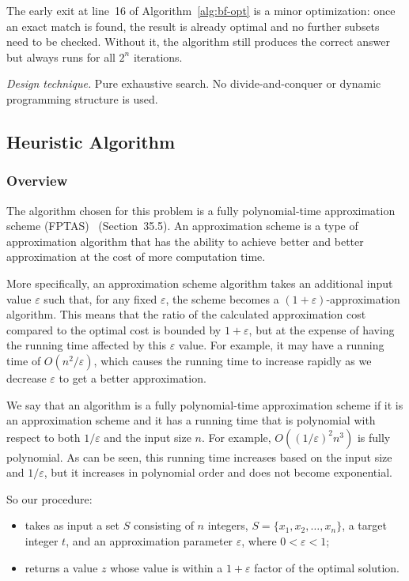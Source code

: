 \documentclass[12pt,a4paper]{article}
\theoremstyle{definition}
\begin{document}
The early exit at line~16 of Algorithm~\ref{alg:bf-opt} is a minor
optimization: once an exact match is found, the result is already optimal and
no further subsets need to be checked. Without it, the algorithm still produces
the correct answer but always runs for all $2^n$ iterations.

\medskip
\noindent\textit{Design technique.} Pure exhaustive search. No divide-and-conquer
or dynamic programming structure is used.

\subsection{Heuristic Algorithm}
\subsubsection{Overview}

The algorithm chosen for this problem is a fully polynomial-time approximation scheme
(FPTAS)~\cite{clrs} (Section~35.5). An approximation scheme is a type of approximation algorithm
that has the ability to achieve better and better approximation at the cost of more
computation time.

More specifically, an approximation scheme algorithm takes an additional input value
$\varepsilon$ such that, for any fixed $\varepsilon$, the scheme becomes a
$(1+\varepsilon)$-approximation algorithm. This means that the ratio of the calculated
approximation cost compared to the optimal cost is bounded by $1+\varepsilon$, but at
the expense of having the running time affected by this $\varepsilon$ value. For example,
it may have a running time of $O(n^2/\varepsilon)$, which causes the running time to
increase rapidly as we decrease $\varepsilon$ to get a better approximation.

We say that an algorithm is a fully polynomial-time approximation scheme if it is an
approximation scheme and it has a running time that is polynomial with respect to both
$1/\varepsilon$ and the input size $n$. For example, $O((1/\varepsilon)^2 n^3)$ is
fully polynomial. As can be seen, this running time increases based on the input size
and $1/\varepsilon$, but it increases in polynomial order and does not become exponential.

So our procedure:
\begin{itemize}
    \item takes as input a set $S$ consisting of $n$ integers,
    $S = \{x_1, x_2, \ldots, x_n\}$, a target integer $t$, and an approximation
    parameter $\varepsilon$, where $0 < \varepsilon < 1$;
    
    \item returns a value $z$ whose value is within a $1+\varepsilon$ factor of the
    optimal solution.
\end{itemize}
\end{document}
